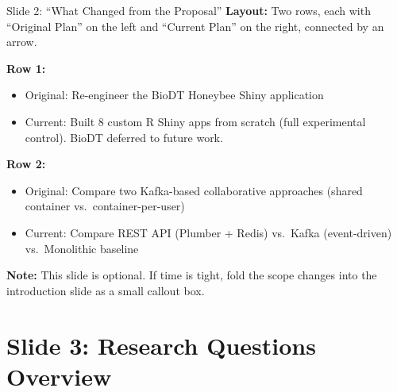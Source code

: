 \documentclass[12pt,a4paper]{article}
\begin{document}
\begin{slidebox}{Slide 2: ``What Changed from the Proposal''}
\textbf{Layout:} Two rows, each with ``Original Plan'' on the left and ``Current Plan'' on the right, connected by an arrow.

\textbf{Row 1:}
\begin{itemize}[nosep]
  \item Original: Re-engineer the BioDT Honeybee Shiny application
  \item Current: Built 8 custom R Shiny apps from scratch (full experimental control). BioDT deferred to future work.
\end{itemize}

\textbf{Row 2:}
\begin{itemize}[nosep]
  \item Original: Compare two Kafka-based collaborative approaches (shared container vs.\ container-per-user)
  \item Current: Compare REST API (Plumber + Redis) vs.\ Kafka (event-driven) vs.\ Monolithic baseline
\end{itemize}

\textbf{Note:} This slide is optional. If time is tight, fold the scope changes into the introduction slide as a small callout box.
\end{slidebox}

\section{Slide 3: Research Questions Overview}
\end{document}
